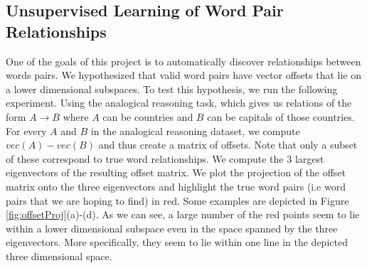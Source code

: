 \documentclass[11pt]{article}
\begin{document}
\subsection{Unsupervised Learning of Word Pair Relationships}
One of the goals of this project is to automatically discover relationships between words pairs. We hypothesized that valid word pairs have vector offsets that lie on a lower dimensional subspaces. To test this hypothesis, we run the following experiment. Using the analogical reasoning task, which gives us relations of the form $A\to B$ where $A$ can be countries and $B$ can be capitals of those countries. For every $A$ and $B$ in the analogical reasoning dataset, we compute $vec(A)-vec(B)$ and thus create a matrix of offsets. Note that only a subset of these correspond to true word relationships. We compute the $3$ largest eigenvectors of the resulting offset matrix. We plot the projection of the offset matrix onto the three eigenvectors and highlight the true word pairs (i.e word pairs that we are hoping to find) in red. Some examples are depicted in Figure \ref{fig:offsetProj}(a)-(d). As we can see, a large number of the red points seem to lie within a lower dimensional subspace even in the space spanned by the three eigenvectors. More specifically, they seem to lie within one line in the depicted three dimensional space. 
\end{document}
